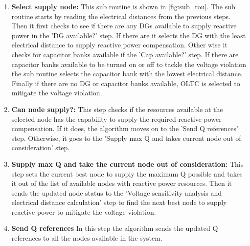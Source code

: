 \begin{enumerate}
    \item \textbf{Select supply node:} This sub routine is shown in \ref{fig:sub_rou}. The sub routine starts by reading the electrical distances from the previous steps. Then it first checks to see if there are any DGs available to supply reactive power in the 'DG available?' step. If there are it selects the DG with the least electrical distance to supply reactive power compensation. Other wise it checks for capacitor banks available if the 'Cap available?' step. If there are capacitor banks available to be turned on or off to tackle the voltage violation the sub routine selects the capacitor bank with the lowest electrical distance. Finally if there are no DG or capacitor banks available, OLTC is selected to mitigate the voltage violation. 
    
    \item \textbf{Can node supply?:} This step checks if the resources available at the selected node has the capability to supply the required reactive power compensation. If it does, the algorithm moves on to the 'Send Q references' step. Otherwise, it goes to the 'Supply max Q and takes current node out of consideration' step.
    
    
     \item \textbf{Supply max Q and take the current node out of consideration:} This step sets the current best node to supply the maximum Q possible and takes it out of the list of available nodes with reactive power resources. Then it sends the updated node status to the 'Voltage sensitivity analysis and electrical distance calculation' step to find the next best node to supply reactive power to mitigate the voltage violation.
     
     \item \textbf{Send Q references} In this step the algorithm sends the updated Q references to all the nodes available in the system.
\end{enumerate}

